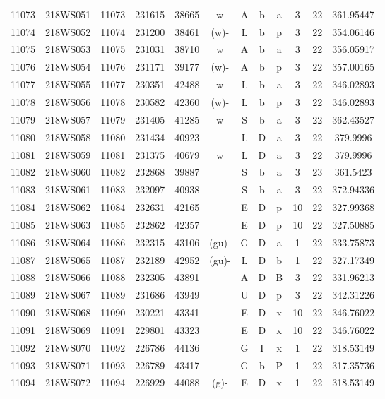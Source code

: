 \begin{tabular}{|*{12}{c|}}
11073 & 218WS051 & 11073 & 231615 & 38665 & w & A & b & a & 3 & 22 & 361.95447 \\ 
11074 & 218WS052 & 11074 & 231200 & 38461 & (w)- & L & b & p & 3 & 22 & 354.06146 \\ 
11075 & 218WS053 & 11075 & 231031 & 38710 & w & A & b & a & 3 & 22 & 356.05917 \\ 
11076 & 218WS054 & 11076 & 231171 & 39177 & (w)- & A & b & p & 3 & 22 & 357.00165 \\ 
11077 & 218WS055 & 11077 & 230351 & 42488 & w & L & b & a & 3 & 22 & 346.02893 \\ 
11078 & 218WS056 & 11078 & 230582 & 42360 & (w)- & L & b & p & 3 & 22 & 346.02893 \\ 
11079 & 218WS057 & 11079 & 231405 & 41285 & w & S & b & a & 3 & 22 & 362.43527 \\ 
11080 & 218WS058 & 11080 & 231434 & 40923 &  & L & D & a & 3 & 22 & 379.9996 \\ 
11081 & 218WS059 & 11081 & 231375 & 40679 & w & L & D & a & 3 & 22 & 379.9996 \\ 
11082 & 218WS060 & 11082 & 232868 & 39887 &  & S & b & a & 3 & 23 & 361.5423 \\ 
11083 & 218WS061 & 11083 & 232097 & 40938 &  & S & b & a & 3 & 22 & 372.94336 \\ 
11084 & 218WS062 & 11084 & 232631 & 42165 &  & E & D & p & 10 & 22 & 327.99368 \\ 
11085 & 218WS063 & 11085 & 232862 & 42357 &  & E & D & p & 10 & 22 & 327.50885 \\ 
11086 & 218WS064 & 11086 & 232315 & 43106 & (gu)- & G & D & a & 1 & 22 & 333.75873 \\ 
11087 & 218WS065 & 11087 & 232189 & 42952 & (gu)- & L & D & b & 1 & 22 & 327.17349 \\ 
11088 & 218WS066 & 11088 & 232305 & 43891 &  & A & D & B & 3 & 22 & 331.96213 \\ 
11089 & 218WS067 & 11089 & 231686 & 43949 &  & U & D & p & 3 & 22 & 342.31226 \\ 
11090 & 218WS068 & 11090 & 230221 & 43341 &  & E & D & x & 10 & 22 & 346.76022 \\ 
11091 & 218WS069 & 11091 & 229801 & 43323 &  & E & D & x & 10 & 22 & 346.76022 \\ 
11092 & 218WS070 & 11092 & 226786 & 44136 &  & G & I & x & 1 & 22 & 318.53149 \\ 
11093 & 218WS071 & 11093 & 226789 & 43417 &  & G & b & P & 1 & 22 & 317.35736 \\ 
11094 & 218WS072 & 11094 & 226929 & 44088 & (g)- & E & D & x & 1 & 22 & 318.53149 \\ 

\end{tabular}
